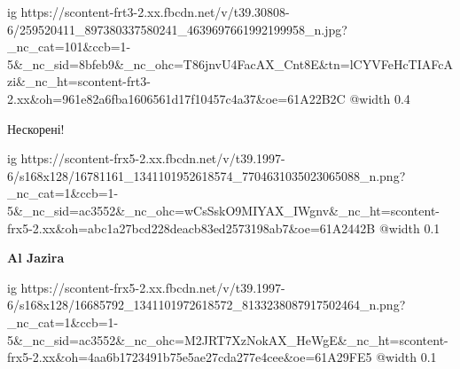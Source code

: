  
 
 
 
 

\ifcmt
  ig https://scontent-frt3-2.xx.fbcdn.net/v/t39.30808-6/259520411_897380337580241_4639697661992199958_n.jpg?_nc_cat=101&ccb=1-5&_nc_sid=8bfeb9&_nc_ohc=T86jnvU4FacAX_Cnt8E&tn=lCYVFeHcTIAFcAzi&_nc_ht=scontent-frt3-2.xx&oh=961e82a6fba1606561d17f10457c4a37&oe=61A22B2C
  @width 0.4
\fi

Нескорені!


\ifcmt
  ig https://scontent-frx5-2.xx.fbcdn.net/v/t39.1997-6/s168x128/16781161_1341101952618574_7704631035023065088_n.png?_nc_cat=1&ccb=1-5&_nc_sid=ac3552&_nc_ohc=wCsSskO9MIYAX_IWgnv&_nc_ht=scontent-frx5-2.xx&oh=abc1a27bcd228deacb83ed2573198ab7&oe=61A2442B
  @width 0.1
\fi

\textbf{Al Jazira}

\ifcmt
  ig https://scontent-frx5-2.xx.fbcdn.net/v/t39.1997-6/s168x128/16685792_1341101972618572_8133238087917502464_n.png?_nc_cat=1&ccb=1-5&_nc_sid=ac3552&_nc_ohc=M2JRT7XzNokAX_HeWgE&_nc_ht=scontent-frx5-2.xx&oh=4aa6b1723491b75e5ae27cda277e4cee&oe=61A29FE5
  @width 0.1
\fi
